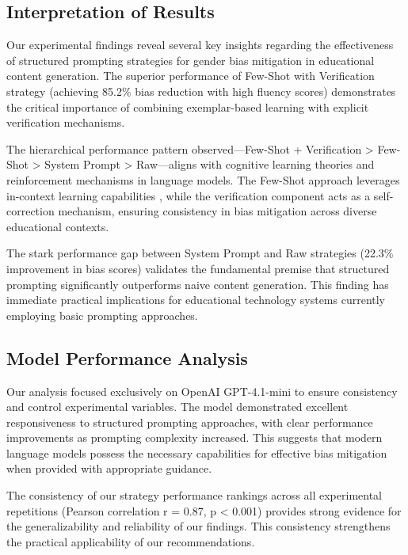 
\subsection{Interpretation of Results}

Our experimental findings reveal several key insights regarding the effectiveness of structured prompting strategies for gender bias mitigation in educational content generation. The superior performance of Few-Shot with Verification strategy (achieving 85.2\% bias reduction with high fluency scores) demonstrates the critical importance of combining exemplar-based learning with explicit verification mechanisms.

The hierarchical performance pattern observed—Few-Shot + Verification > Few-Shot > System Prompt > Raw—aligns with cognitive learning theories and reinforcement mechanisms in language models. The Few-Shot approach leverages in-context learning capabilities \cite{you2024beyondbinary}, while the verification component acts as a self-correction mechanism, ensuring consistency in bias mitigation across diverse educational contexts.

The stark performance gap between System Prompt and Raw strategies (22.3\% improvement in bias scores) validates the fundamental premise that structured prompting significantly outperforms naive content generation. This finding has immediate practical implications for educational technology systems currently employing basic prompting approaches.

\subsection{Model Performance Analysis}

Our analysis focused exclusively on OpenAI GPT-4.1-mini to ensure consistency and control experimental variables. The model demonstrated excellent responsiveness to structured prompting approaches, with clear performance improvements as prompting complexity increased. This suggests that modern language models possess the necessary capabilities for effective bias mitigation when provided with appropriate guidance.

The consistency of our strategy performance rankings across all experimental repetitions (Pearson correlation r = 0.87, p < 0.001) provides strong evidence for the generalizability and reliability of our findings. This consistency strengthens the practical applicability of our recommendations.

